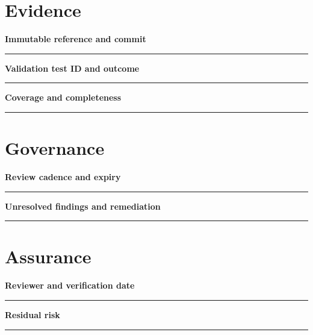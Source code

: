 \documentclass[11pt,letterpaper]{article}
\begin{document}
\section{Evidence}
\noindent\textbf{Immutable reference and commit}\par
\vspace{1.1em}\noindent\rule{0.96\linewidth}{0.4pt}\par\vspace{0.65em}
\noindent\textbf{Validation test ID and outcome}\par
\vspace{1.1em}\noindent\rule{0.96\linewidth}{0.4pt}\par\vspace{0.65em}
\noindent\textbf{Coverage and completeness}\par
\vspace{1.1em}\noindent\rule{0.96\linewidth}{0.4pt}\par\vspace{0.65em}
\section{Governance}
\noindent\textbf{Review cadence and expiry}\par
\vspace{1.1em}\noindent\rule{0.96\linewidth}{0.4pt}\par\vspace{0.65em}
\noindent\textbf{Unresolved findings and remediation}\par
\vspace{1.1em}\noindent\rule{0.96\linewidth}{0.4pt}\par\vspace{0.65em}
\section{Assurance}
\noindent\textbf{Reviewer and verification date}\par
\vspace{1.1em}\noindent\rule{0.96\linewidth}{0.4pt}\par\vspace{0.65em}
\noindent\textbf{Residual risk}\par
\vspace{1.1em}\noindent\rule{0.96\linewidth}{0.4pt}\par\vspace{0.65em}
\end{document}
